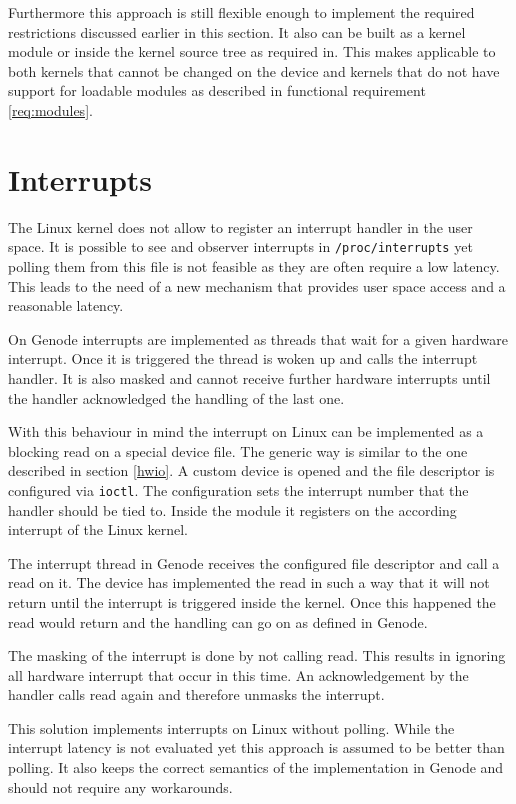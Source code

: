 \documentclass[
a4paper,
11pt,
twoside
]{report}
\begin{document}
		Furthermore this approach is still flexible enough to implement the required restrictions discussed earlier in this section.
		It also can be built as a kernel module or inside the kernel source tree as required in.
		This makes applicable to both kernels that cannot be changed on the device and kernels that do not have support for loadable modules as described in functional requirement \ref{req:modules}.
		
		\section{Interrupts}
		\label{irq}
		
		The Linux kernel does not allow to register an interrupt handler in the user space.
		It is possible to see and observer interrupts in \texttt{/proc/interrupts} yet polling them from this file is not feasible as they are often require a low latency.
		This leads to the need of a new mechanism that provides user space access and a reasonable latency.
		
		On Genode interrupts are implemented as threads that wait for a given hardware interrupt.
		Once it is triggered the thread is woken up and calls the interrupt handler.
		It is also masked and cannot receive further hardware interrupts until the handler acknowledged the handling of the last one. \citep{genode}
		
		With this behaviour in mind the interrupt on Linux can be implemented as a blocking read on a special device file.
		The generic way is similar to the one described in section \ref{hwio}.
		A custom device is opened and the file descriptor is configured via \texttt{ioctl}.
		The configuration sets the interrupt number that the handler should be tied to.
		Inside the module it registers on the according interrupt of the Linux kernel.
		
		The interrupt thread in Genode receives the configured file descriptor and call a read on it.
		The device has implemented the read in such a way that it will not return until the interrupt is triggered inside the kernel.
		Once this happened the read would return and the handling can go on as defined in Genode.
		
		The masking of the interrupt is done by not calling read.
		This results in ignoring all hardware interrupt that occur in this time.
		An acknowledgement by the handler calls read again and therefore unmasks the interrupt.
		
		This solution implements interrupts on Linux without polling.
		While the interrupt latency is not evaluated yet this approach is assumed to be better than polling.
		It also keeps the correct semantics of the implementation in Genode and should not require any workarounds.
		
\end{document}
